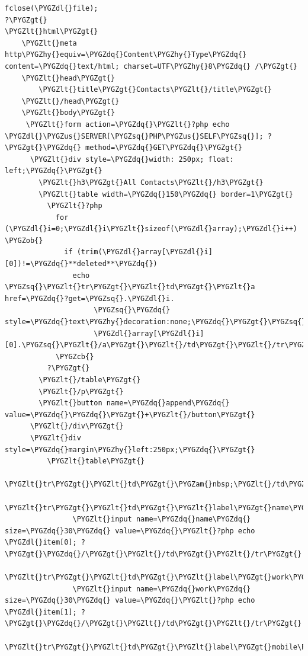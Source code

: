 \documentclass[a5paper,10pt,spanish]{sphinxmanual}
\def\PYGZus{\char`\_}
\def\PYGZob{\char`\{}
\def\PYGZcb{\char`\}}
\def\PYGZam{\char`\&}
\def\PYGZlt{\char`\<}
\def\PYGZgt{\char`\>}
\def\PYGZdl{\char`\$}
\def\PYGZhy{\char`\-}
\def\PYGZsq{\char`\'}
\def\PYGZdq{\char`\"}
\begin{document}
\begin{Verbatim}[commandchars=\\\{\}]
fclose(\PYGZdl{}file);
?\PYGZgt{}
\PYGZlt{}html\PYGZgt{}
    \PYGZlt{}meta http\PYGZhy{}equiv=\PYGZdq{}Content\PYGZhy{}Type\PYGZdq{} content=\PYGZdq{}text/html; charset=UTF\PYGZhy{}8\PYGZdq{} /\PYGZgt{}
    \PYGZlt{}head\PYGZgt{}
        \PYGZlt{}title\PYGZgt{}Contacts\PYGZlt{}/title\PYGZgt{}
    \PYGZlt{}/head\PYGZgt{}
    \PYGZlt{}body\PYGZgt{}
     \PYGZlt{}form action=\PYGZdq{}\PYGZlt{}?php echo \PYGZdl{}\PYGZus{}SERVER[\PYGZsq{}PHP\PYGZus{}SELF\PYGZsq{}]; ?\PYGZgt{}\PYGZdq{} method=\PYGZdq{}GET\PYGZdq{}\PYGZgt{}
      \PYGZlt{}div style=\PYGZdq{}width: 250px; float: left;\PYGZdq{}\PYGZgt{}
        \PYGZlt{}h3\PYGZgt{}All Contacts\PYGZlt{}/h3\PYGZgt{}
        \PYGZlt{}table width=\PYGZdq{}150\PYGZdq{} border=1\PYGZgt{}
          \PYGZlt{}?php
            for (\PYGZdl{}i=0;\PYGZdl{}i\PYGZlt{}sizeof(\PYGZdl{}array);\PYGZdl{}i++) \PYGZob{}
              if (trim(\PYGZdl{}array[\PYGZdl{}i][0])!=\PYGZdq{}**deleted**\PYGZdq{})
                echo \PYGZsq{}\PYGZlt{}tr\PYGZgt{}\PYGZlt{}td\PYGZgt{}\PYGZlt{}a href=\PYGZdq{}?get=\PYGZsq{}.\PYGZdl{}i.
                     \PYGZsq{}\PYGZdq{} style=\PYGZdq{}text\PYGZhy{}decoration:none;\PYGZdq{}\PYGZgt{}\PYGZsq{}.
                     \PYGZdl{}array[\PYGZdl{}i][0].\PYGZsq{}\PYGZlt{}/a\PYGZgt{}\PYGZlt{}/td\PYGZgt{}\PYGZlt{}/tr\PYGZgt{}\PYGZsq{};
            \PYGZcb{}
          ?\PYGZgt{}
        \PYGZlt{}/table\PYGZgt{}
        \PYGZlt{}/p\PYGZgt{}
        \PYGZlt{}button name=\PYGZdq{}append\PYGZdq{} value=\PYGZdq{}\PYGZdq{}\PYGZgt{}+\PYGZlt{}/button\PYGZgt{}
      \PYGZlt{}/div\PYGZgt{}
      \PYGZlt{}div style=\PYGZdq{}margin\PYGZhy{}left:250px;\PYGZdq{}\PYGZgt{}
          \PYGZlt{}table\PYGZgt{}
            \PYGZlt{}tr\PYGZgt{}\PYGZlt{}td\PYGZgt{}\PYGZam{}nbsp;\PYGZlt{}/td\PYGZgt{}\PYGZlt{}/tr\PYGZgt{}
            \PYGZlt{}tr\PYGZgt{}\PYGZlt{}td\PYGZgt{}\PYGZlt{}label\PYGZgt{}name\PYGZlt{}/label\PYGZgt{}\PYGZlt{}/td\PYGZgt{}\PYGZlt{}td\PYGZgt{}
                \PYGZlt{}input name=\PYGZdq{}name\PYGZdq{} size=\PYGZdq{}30\PYGZdq{} value=\PYGZdq{}\PYGZlt{}?php echo \PYGZdl{}item[0]; ?\PYGZgt{}\PYGZdq{}/\PYGZgt{}\PYGZlt{}/td\PYGZgt{}\PYGZlt{}/tr\PYGZgt{}
            \PYGZlt{}tr\PYGZgt{}\PYGZlt{}td\PYGZgt{}\PYGZlt{}label\PYGZgt{}work\PYGZlt{}/label\PYGZgt{}\PYGZlt{}/td\PYGZgt{}\PYGZlt{}td\PYGZgt{}
                \PYGZlt{}input name=\PYGZdq{}work\PYGZdq{} size=\PYGZdq{}30\PYGZdq{} value=\PYGZdq{}\PYGZlt{}?php echo \PYGZdl{}item[1]; ?\PYGZgt{}\PYGZdq{}/\PYGZgt{}\PYGZlt{}/td\PYGZgt{}\PYGZlt{}/tr\PYGZgt{}
            \PYGZlt{}tr\PYGZgt{}\PYGZlt{}td\PYGZgt{}\PYGZlt{}label\PYGZgt{}mobile\PYGZlt{}/label\PYGZgt{}\PYGZlt{}/td\PYGZgt{}\PYGZlt{}td\PYGZgt{}

\end{Verbatim}
\end{document}
